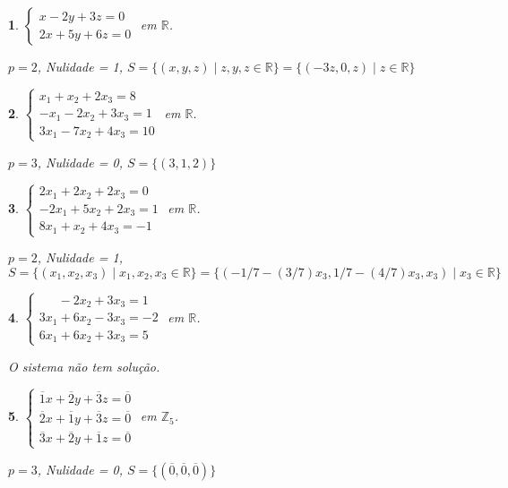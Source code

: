 \documentclass[12pt]{exam}
\newtheorem{exercicio}{}
\newcommand{\integer}{\mathbb{Z}}
\newcommand{\real}{\mathbb{R}}
\begin{document}
\begin{exercicio}
$\begin{cases}
  x - 2y + 3z = 0\\
  2x + 5y + 6z = 0
\end{cases}$ em $\real$.
\begin{solucao}
  $p = 2$, Nulidade = 1, $S = \{(x, y, z) \mid z, y, z \in \real\} = \{(-3z, 0, z) \mid z \in \real\}$
\end{solucao}
\end{exercicio}


\begin{exercicio}
$\begin{cases}
  x_1 + x_2 + 2x_3 = 8\\
  -x_1 - 2x_2 + 3x_3 = 1\\
  3x_1 - 7x_2 + 4x_3 = 10
\end{cases}$ em $\real$.
\begin{solucao}
  $p = 3$, Nulidade = 0, $S = \{(3, 1, 2)\}$
\end{solucao}
\end{exercicio}

\begin{exercicio}
$\begin{cases}
  2x_1 + 2x_2 + 2x_3 = 0\\
  -2x_1 + 5x_2 + 2x_3 = 1\\
  8x_1 + x_2 + 4x_3 = -1
\end{cases}$ em $\real$.
\begin{solucao}
  $p = 2$, Nulidade = 1, $S = \{(x_1, x_2, x_3) \mid x_1, x_2, x_3 \in \real\} = \{(-1/7 - (3/7)x_3, 1/7 - (4/7)x_3, x_3) \mid x_3 \in \real\}$
\end{solucao}
\end{exercicio}

\begin{exercicio}
$\begin{cases}
  \phantom{2x_1} - 2x_2 + 3x_3 = 1\\
  3x_1 + 6x_2 - 3x_3 = -2\\
  6x_1 + 6x_2 + 3x_3 = 5
\end{cases}$ em $\real$.
\begin{solucao}
  O sistema n\~ao tem solu\c{c}\~ao.
\end{solucao}
\end{exercicio}

\begin{exercicio}
$\begin{cases}
  \overline{1}x + \overline{2}y + \overline{3}z = \overline{0}\\
  \overline{2}x + \overline{1}y + \overline{3}z = \overline{0}\\
  \overline{3}x + \overline{2}y + \overline{1}z = \overline{0}
\end{cases}$ em $\integer_5$.
\begin{solucao}
  $p = 3$, Nulidade = 0, $S = \{(\overline{0},\overline{0},\overline{0})\}$
\end{solucao}
\end{exercicio}
\end{document}
